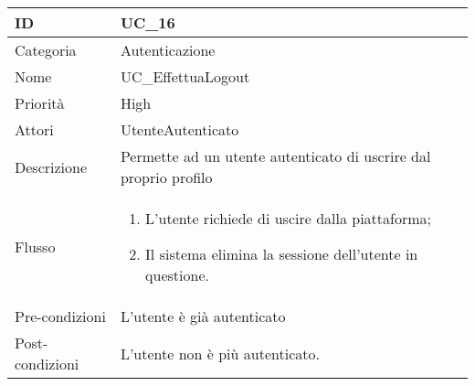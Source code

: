 \begin{center}
\begin{tabular}{ |p{2cm}|p{13cm}|  }
\hline
ID & UC\_16\\\hline
Categoria & Autenticazione \\\hline
Nome & UC\_EffettuaLogout \\\hline
Priorità & High \\\hline
Attori &  UtenteAutenticato \\\hline
Descrizione & Permette ad un utente autenticato di uscrire dal proprio profilo \\\hline
Flusso &  	\begin{enumerate}
			\item L'utente richiede di uscire dalla piattaforma;
			\item Il sistema elimina la sessione dell'utente in questione.
		\end{enumerate}\\\hline
Pre-condizioni &  L'utente è già autenticato\\\hline
Post-condizioni &  L'utente non è più autenticato.\\\hline
\end{tabular}
\label{table_use_case:16}\newline




\end{center}

